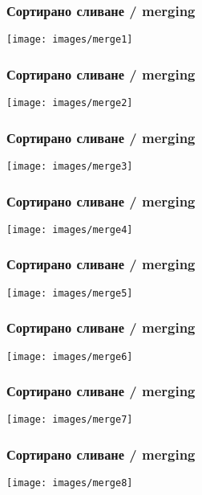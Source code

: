 \documentclass{beamer}
\begin{document}
\begin{frame}[fragile]
\frametitle{Сортирано сливане / merging}


\texttt{[image: images/merge1]} 

\end{frame}
\begin{frame}[fragile]
\frametitle{Сортирано сливане / merging}


\texttt{[image: images/merge2]} 

\end{frame}
\begin{frame}[fragile]
\frametitle{Сортирано сливане / merging}


\texttt{[image: images/merge3]} 

\end{frame}
\begin{frame}[fragile]
\frametitle{Сортирано сливане / merging}


\texttt{[image: images/merge4]} 

\end{frame}
\begin{frame}[fragile]
\frametitle{Сортирано сливане / merging}


\texttt{[image: images/merge5]} 

\end{frame}
\begin{frame}[fragile]
\frametitle{Сортирано сливане / merging}


\texttt{[image: images/merge6]} 

\end{frame}
\begin{frame}[fragile]
\frametitle{Сортирано сливане / merging}


\texttt{[image: images/merge7]} 

\end{frame}
\begin{frame}[fragile]
\frametitle{Сортирано сливане / merging}


\texttt{[image: images/merge8]} 

\end{frame}
\end{document}
